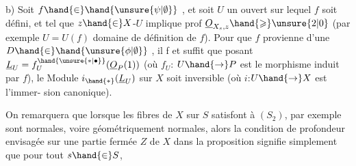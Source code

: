 b)   Soit
$f \hand{\in} \hand{\unsure{\psi|\emptyset}}$ , et soit $U$ un ouvert sur lequel $f$ soit défini, et tel que $z \hand{\in} X$-$U$
implique prof $\underline{O}_{X_s,z} \hand{\geqslant} \unsure{2|0}$  (par exemple $U = U(f)$ domaine de
définition de $f$). Pour que $f$ provienne d'une $D \hand{\in} \hand{\unsure{\phi|\emptyset}}$ , il f et suffit  que\hand{\unsure{$\surd$}}
posant $\underline{L}_U = f_U^{\hand{\unsure{*|\bullet}}}(\underline{O}_P(1))$  (où  $f_U$: $U \hand{\to} P$  est le morphisme induit par $f$),
 le Module  $i_{\hand{*}}(\underline{L}_U)$  sur $X$ soit inversible (où $i$:$U \hand{\to} X$ est l'immer-%
sion canonique).

On remarquera que lorsque  les fibres de $X$ sur $S$ satisfont à $(S_2)$,
par exemple sont normales, voire géométriquement  normales, alors la
condition de profondeur  envisagée sur  une partie fermée $Z$ de $X$ dans 
la proposition  signifie simplement que pour tout $s \hand{\in} S$,

